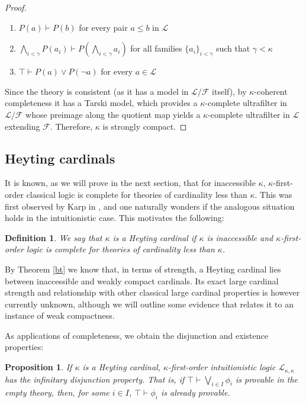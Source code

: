 \documentclass[a4paper,11pt]{article}
\theoremstyle{plain}
\newtheorem{proposition}[thm]{Proposition}
\theoremstyle{plain}
\newtheorem{defs}[thm]{Definition}
\theoremstyle{remark}
\begin{document}
\begin{proof}
 \begin{enumerate}
  \item $P(a) \vdash P(b)$ for every pair $a \leq b$ in $\mathcal{L}$
  \item $\bigwedge_{i<\gamma}P(a_i) \vdash P(\bigwedge_{i<\gamma}a_i)$ for all families $\{a_i\}_{i<\gamma}$ such that $\gamma<\kappa$
  \item $\top \vdash P(a) \vee P(\neg a)$ for every $a \in \mathcal{L}$
 \end{enumerate}
 
 Since the theory is consistent (as it has a model in $\mathcal{L}/\mathcal{F}$ itself), by $\kappa$-coherent completeness it has a Tarski model, which provides a $\kappa$-complete ultrafilter in $\mathcal{L}/\mathcal{F}$ whose preimage along the quotient map yields a $\kappa$-complete ultrafilter in $\mathcal{L}$ extending $\mathcal{F}$. Therefore, $\kappa$ is strongly compact.
\end{proof}

\subsection{Heyting cardinals}

It is known, as we will prove in the next section, that for inaccessible $\kappa$, $\kappa$-first-order classical logic is complete for theories of cardinality less than $\kappa$. This was first observed by Karp in \cite{karp}, and one naturally wonders if the analogous situation holds in the intuitionistic case. This motivates the following:

\begin{defs}
 We say that $\kappa$ is a \emph{Heyting} cardinal if $\kappa$ is inaccessible and $\kappa$-first-order logic is complete for theories of cardinality less than $\kappa$.
\end{defs}

By Theorem \ref{bt} we know that, in terms of strength, a Heyting cardinal lies between inaccessible and weakly compact cardinals. Its exact large cardinal strength and relationship with other classical large cardinal properties is however currently unknown, although we will outline some evidence that relates it to an instance of weak compactness.

As applications of completeness, we obtain the disjunction and existence properties:

\begin{proposition}\label{dp}
If $\kappa$ is a Heyting cardinal, $\kappa$-first-order intuitionistic logic $\mathcal{L}_{\kappa, \kappa}$ has the infinitary disjunction property. That is, if $\top \vdash \bigvee_{i \in I}\phi_i$ is provable in the empty theory, then, for some $i \in I$, $\top \vdash \phi_i$ is already provable.
\end{proposition}
\end{document}
